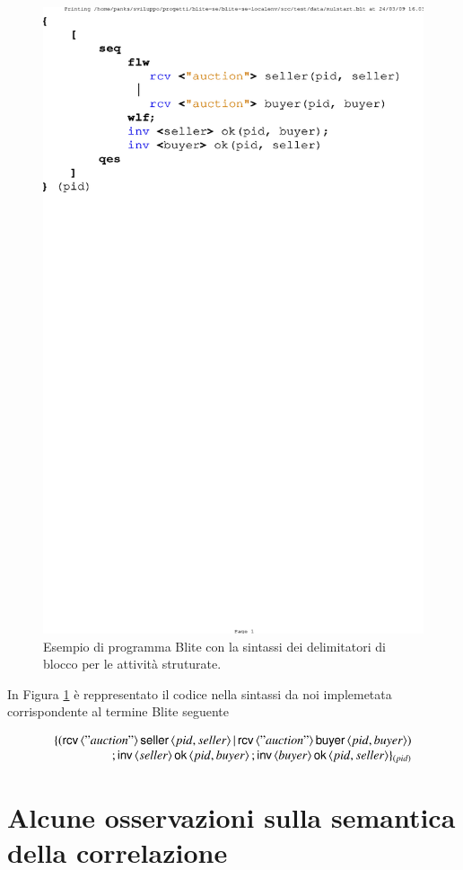 \begin{figure}[!h]
\begin{center}
  \includegraphics[scale=0.80,clip]{linguaggio/dia/blt1}
   \caption[Codice Blite, esempio delimitatori di blocco]{Esempio di programma
   Blite con la sintassi dei delimitatori di blocco per le attività struturate.}
  \label{fig:lin:blt1}
\end{center}
\end{figure}

In Figura \ref{fig:lin:blt1} è reppresentato il codice nella sintassi
da noi implemetata corrispondente al termine Blite seguente

$$
\begin{array}{rl}
\{ 
(
	{\sf rcv}\,\langle "auction" \rangle \, {\sf seller}\, \langle pid, seller \rangle
	\,|\,
	{\sf rcv}\,\langle "auction" \rangle \, {\sf buyer}\, \langle pid, buyer \rangle 
)
\\
\, ; 
{\sf inv}\,\langle seller \rangle \,{\sf ok}\,\langle pid, buyer \rangle
\, ;
{\sf inv}\,\langle buyer \rangle \,{\sf ok}\,\langle pid, seller \rangle
 \}_{(pid)}
\end{array}
$$


\section{Alcune osservazioni sulla semantica della correlazione}
